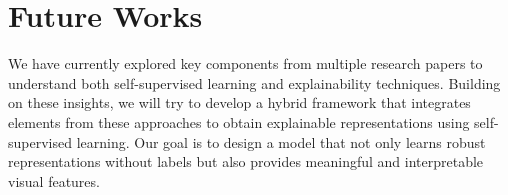 \section{Future Works}
\label{sec:future_works}

We have currently explored key components from multiple research papers to understand both self-supervised learning and explainability techniques. Building on these insights, we will try to develop a hybrid framework that integrates elements from these approaches to obtain explainable representations using self-supervised learning. Our goal is to design a model that not only learns robust representations without labels but also provides meaningful and interpretable visual features.
